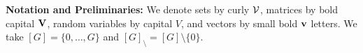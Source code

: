 %
{\bf Notation and Preliminaries:}
We denote sets by curly ${\cal V}$, matrices by bold capital $\mathbf{V}$, random variables by capital $V$, and vectors by small bold $\mathbf{v}$ letters.
We take $[G] = \{0, \dots, G\}$ and $[G]_\setminus = [G] \setminus \{0\}$.

